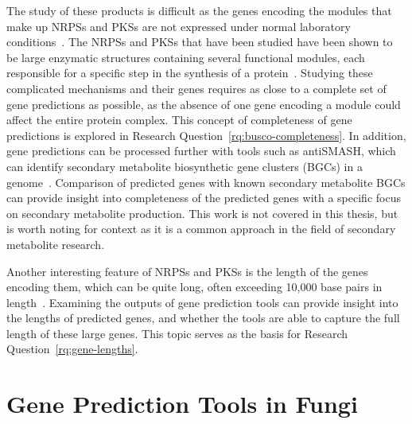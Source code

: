  The study of these products is difficult as the genes encoding the modules that make up NRPSs and PKSs are not expressed under normal laboratory conditions~\cite{Mukherjee2012}. The NRPSs and PKSs that have been studied
 have been shown to be large enzymatic structures containing several 
 functional modules, each responsible for a specific step in the synthesis 
 of a protein~\cite{Mukherjee2012}. Studying these complicated mechanisms and their genes requires as close to a complete set of gene predictions as possible, as the absence of one gene encoding a module could affect the entire protein complex. This concept of completeness of gene predictions is explored in Research Question~\ref{rq:busco-completeness}. 
 In addition, gene predictions can be processed further with tools such as antiSMASH, which can identify secondary metabolite biosynthetic gene clusters (BGCs) in a genome~\cite{blin2023}. Comparison of predicted genes with known secondary metabolite BGCs can provide insight into completeness of the predicted genes with a specific focus on secondary metabolite production. This work is not covered in this thesis, but is worth noting for context as it is a common approach in the field of secondary metabolite research.

 Another interesting feature of NRPSs and PKSs is the length of the genes encoding them, which can be quite long, often exceeding 10,000 base pairs in length~\cite{komaki2020}. Examining the outputs of gene prediction tools can provide insight into the lengths of predicted genes, and whether the tools are able to capture the full length of these large genes. This topic serves as the basis for Research Question~\ref{rq:gene-lengths}.  


\section{Gene Prediction Tools in Fungi}\label{lit:comp-motiv}

